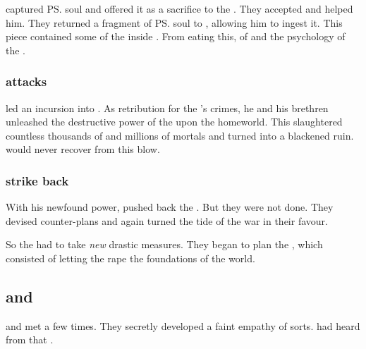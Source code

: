 \Ishnaruchaefir{} captured \ps{\Nathrach} soul and offered it as a sacrifice to the \xss. 
They accepted and helped him. 
They returned a fragment of \ps{\Nathrach} soul to \Ishnaruchaefir, allowing him to ingest it. 
This piece contained some of the  inside \Nathrach. 
From eating this, \Ishnaruchaefir{}  of  and the psychology of the \satharioth. 





\subsubsection{\Ishnaruchaefir attacks \Nyx}
\Ishnaruchaefir led an incursion into \Nyx. 
As retribution for the \resphain's crimes, he and his brethren unleashed the destructive power of the \xss upon the \resphan homeworld. 
This slaughtered countless thousands of \resphain and millions of mortals and turned \Nyx into a blackened ruin. 
\Nyx would never recover from this blow. 





\subsubsection{\Resphain{} strike back}
With his newfound power, \Ishnaruchaefir{} pushed back the \resphain.
But they were not done. 
They devised counter-plans and again turned the tide of the war in their favour. 

So the \dragons{} had to take \emph{new} drastic measures. 
They began to plan the , which consisted of letting the \xss{} rape the foundations of the world. 









\subsection{\Ishnaruchaefir and \Azraid}
\Ishnaruchaefir and \Azraid met a few times. 
They secretly developed a faint empathy of sorts.
\Ishnaruchaefir had heard from \Nexagglachel that . 

